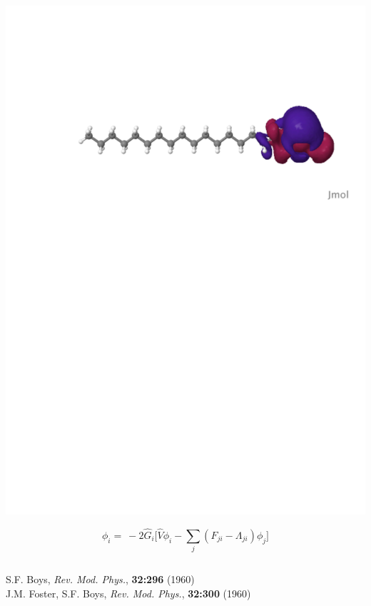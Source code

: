 \begin{frame}
\begin{columns}
\begin{column}[b]{0.48\linewidth}
{    \includegraphics[scale=0.25, clip, viewport = 80 560 600 700]{figures/loc_orb_3.pdf}\\

    \vspace{2mm}

    \begin{equation}
        \nonumber
        \phi_i =\ -2\hat{G}_i\Bigg[\hat{V}\phi_i
        - \sum_j(F_{ji} - \Lambda_{ji})\phi_j\Bigg]
    \end{equation}
}
    \end{column}
    \end{columns}

    \vspace{6mm}

    \centering
    \tiny
    S.F. Boys,
    {\it Rev. Mod. Phys.}, 
    \textbf{32:296}
    (1960)\\
    J.M. Foster, S.F. Boys,
    {\it Rev. Mod. Phys.}, 
    \textbf{32:300}
    (1960)
\end{frame}

